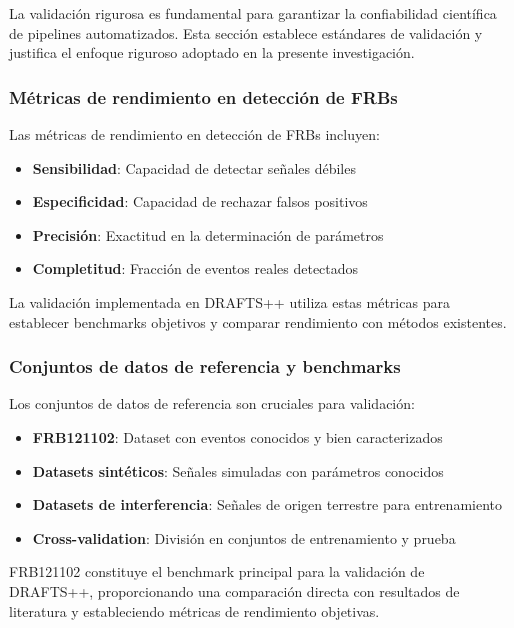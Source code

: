 La validación rigurosa es fundamental para garantizar la confiabilidad científica de pipelines automatizados. Esta sección establece estándares de validación y justifica el enfoque riguroso adoptado en la presente investigación.

\subsubsection{Métricas de rendimiento en detección de FRBs}

Las métricas de rendimiento en detección de FRBs incluyen:

\begin{itemize}
    \item \textbf{Sensibilidad}: Capacidad de detectar señales débiles
    \item \textbf{Especificidad}: Capacidad de rechazar falsos positivos
    \item \textbf{Precisión}: Exactitud en la determinación de parámetros
    \item \textbf{Completitud}: Fracción de eventos reales detectados
\end{itemize}

La validación implementada en DRAFTS++ utiliza estas métricas para establecer benchmarks objetivos y comparar rendimiento con métodos existentes.

\subsubsection{Conjuntos de datos de referencia y benchmarks}

Los conjuntos de datos de referencia son cruciales para validación:

\begin{itemize}
    \item \textbf{FRB121102}: Dataset con eventos conocidos y bien caracterizados
    \item \textbf{Datasets sintéticos}: Señales simuladas con parámetros conocidos
    \item \textbf{Datasets de interferencia}: Señales de origen terrestre para entrenamiento
    \item \textbf{Cross-validation}: División en conjuntos de entrenamiento y prueba
\end{itemize}

FRB121102 constituye el benchmark principal para la validación de DRAFTS++, proporcionando una comparación directa con resultados de literatura y estableciendo métricas de rendimiento objetivas.

